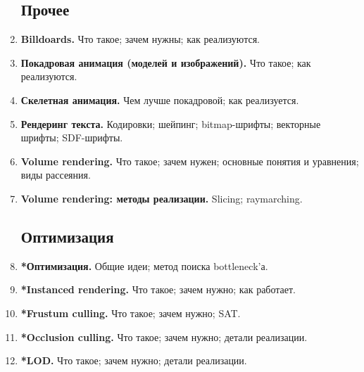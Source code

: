 \documentclass{article}
\begin{document}
\begin{enumerate}
\subsection{Прочее}
\item \textbf{Billdoards.} Что такое; зачем нужны; как реализуются.
\item \textbf{Покадровая анимация (моделей и изображений).} Что такое; как реализуются.
\item \textbf{Скелетная анимация.} Чем лучше покадровой; как реализуется.
\item \textbf{Рендеринг текста.} Кодировки; шейпинг; bitmap-шрифты; векторные шрифты; SDF-шрифты.
\item \textbf{Volume rendering.} Что такое; зачем нужен; основные понятия и уравнения; виды рассеяния.
\item \textbf{Volume rendering: методы реализации.} Slicing; raymarching.

\subsection{Оптимизация}
\item \textbf{*Оптимизация.} Общие идеи; метод поиска bottleneck'а.
\item \textbf{*Instanced rendering.} Что такое; зачем нужно; как работает.
\item \textbf{*Frustum culling.} Что такое; зачем нужно; SAT.
\item \textbf{*Occlusion culling.} Что такое; зачем нужно; детали реализации.
\item \textbf{*LOD.} Что такое; зачем нужно; детали реализации.
\end{enumerate}
\end{document}
